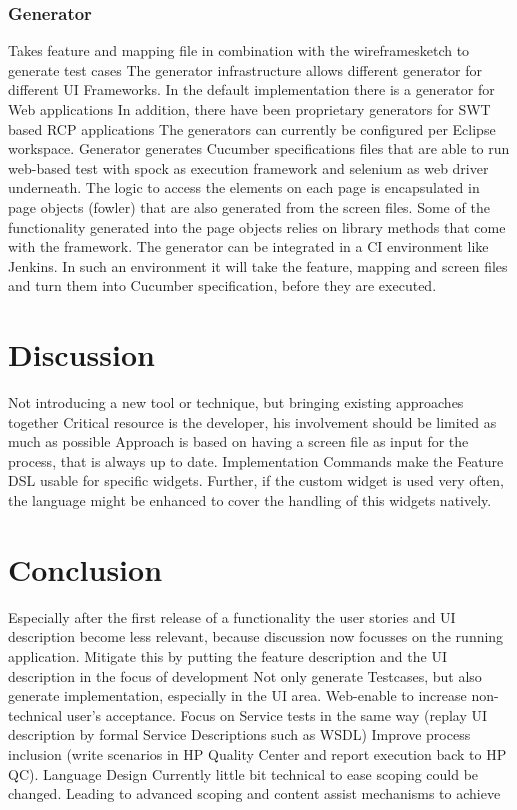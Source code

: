 \documentclass{sig-alternate-05-2015}
\begin{document}
\subsubsection{Generator}
Takes feature and mapping file in combination with the wireframesketch to generate test cases
The generator infrastructure allows different generator for different UI Frameworks. In the default implementation there is a generator for Web applications
In addition, there have been proprietary generators for SWT based RCP applications
The generators can currently be configured per Eclipse workspace.
Generator generates Cucumber specifications files that are able to run web-based test with spock as execution framework and selenium as web driver underneath. 
The logic to access the elements on each page is encapsulated in page objects (fowler) that are also generated from the screen files. Some of the functionality generated into the page objects relies on library methods that come with the framework. 
The generator can be integrated in a CI environment like Jenkins. In such an environment it will take the feature, mapping and screen files and turn them into Cucumber specification, before they are executed. 

\section{Discussion}\label{sec:Discussion}
Not introducing a new tool or technique, but bringing existing approaches together
Critical resource is the developer, his involvement should be limited as much as possible
Approach is based on having a screen file as input for the process, that is always up to date.
Implementation Commands make the Feature DSL usable for specific widgets.
Further, if the custom widget is used very often, the language might be enhanced to cover the handling of this widgets natively.


\section{Conclusion}\label{sec:Conclusion} %
Especially after the first release of a functionality the user stories and UI description become less relevant, because discussion now focusses on the running application. Mitigate this by putting the feature description and the UI description in the focus of development 
Not only generate Testcases, but also generate implementation, especially in the UI area.
Web-enable to increase non-technical user’s acceptance. 
Focus on Service tests in the same way (replay UI description by formal Service Descriptions such as WSDL)
Improve process inclusion (write scenarios in HP Quality Center and report execution back to HP QC). 
Language Design Currently little bit technical to ease scoping could be changed. Leading to advanced scoping and content assist mechanisms to achieve 
\end{document}

